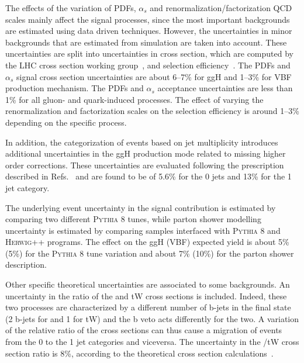 The effects of the variation of PDFs, $\alpha_s$ and renormalization/factorization QCD scales mainly affect the signal processes, since the most important backgrounds are estimated using data driven techniques. However, the uncertainties in minor backgrounds that are estimated from simulation are taken into account. These uncertainties are split into uncertainties in cross section, which are computed by the LHC cross section working group~\cite{deFlorian:2016spz}, and selection efficiency~\cite{Butterworth:2015oua}. The PDFs and $\alpha_{s}$ signal cross section  uncertainties are about 6--7\% for ggH and 1--3\% for VBF production mechanism. The PDFs and $\alpha_{s}$ acceptance uncertainties are less than 1\% for all gluon- and quark-induced processes. The effect of varying the renormalization and factorization scales on the selection efficiency is around 1--3\% depending on the specific process. 

In addition, the categorization of events based on jet multiplicity introduces additional uncertainties in the ggH production mode related to missing higher order corrections. These uncertainties are evaluated following the prescription described in Refs.~\cite{Stewart:2011cf,Heinemeyer:2013tqa} and are found to be of 5.6\% for the 0 jets and 13\% for the 1 jet category.

The underlying event uncertainty in the signal contribution is estimated by comparing two different \textsc{Pythia 8} tunes, while parton shower modelling uncertainty is estimated by comparing samples interfaced with \textsc{Pythia 8} and \textsc{Herwig++} programs. 
The effect on the ggH (VBF) expected yield is about 5\% (5\%) for the \textsc{Pythia 8} tune variation and about 7\% (10\%) for the parton shower description.

Other specific theoretical uncertainties are associated to some backgrounds. An uncertainty in the ratio of the \ttbar and tW cross sections is included. Indeed, these two processes are characterized by a different number of b-jets in the final state (2 b-jets for \ttbar and 1 for tW) and the b veto acts differently for the two. A variation of the relative ratio of the cross sections can thus cause a migration of events from the 0 to the 1 jet categories and viceversa. The uncertainty in the \ttbar/tW cross section ratio is 8\%, according to the theoretical cross section calculations~\cite{Aliev:2010zk,Beneke:2011mq}.

